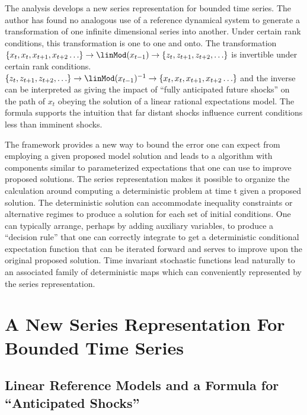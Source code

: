 \documentclass[12pt]{article}
\begin{document}
The analysis develops a new series representation for bounded time series.  The author has found no analogous use of a reference dynamical system to generate a transformation of one infinite dimensional series into another. Under certain rank conditions, this transformation is one to one and onto.  The
transformation $ {\{ x_{t}, x_{t}, x_{t+1},x_{t+2}\ldots\}} \rightarrow \linMod(x_{t-1}) \rightarrow{\{ z_{t}, z_{t+1}, z_{t+2},\ldots\}} $ is invertible under
certain rank conditions. $ {\{ z_{t}, z_{t+1}, z_{t+2},\ldots\}} \rightarrow \linMod(x_{t-1})^{-1} \rightarrow{\{ x_{t}, x_{t}, x_{t+1},x_{t+2}\ldots\}} $ and the inverse can be interpreted as giving the impact of ``fully anticipated future shocks'' on the path of $x_t$ obeying the solution of a linear rational expectations model.  The formula supports the intuition that far distant shocks influence current conditions less than  imminent shocks.

The framework provides a new way to bound the error one can expect from
employing a given proposed model solution and leads to a
algorithm with  components similar to parameterized expectations that
one can use to improve proposed solutions. The series representation makes
it possible to organize the calculation around computing a deterministic
problem at time t given a proposed solution.  The deterministic solution
can accommodate inequality constraints or alternative regimes to produce a
solution for each set of initial conditions.  One can typically arrange,
perhaps by adding auxiliary variables, to produce a ``decision rule''
that one can correctly integrate to get a deterministic conditional
expectation function that can be iterated forward and serves to
improve upon the original proposed solution.
Time invariant stochastic functions 
lead naturally to an associated family of deterministic maps
which can conveniently represented by the series representation.





\section{A New Series Representation For  Bounded Time Series}
\label{sec:newseries}

\subsection{Linear Reference Models and a Formula for  ``Anticipated Shocks''}
\label{sec:linref}
\end{document}
